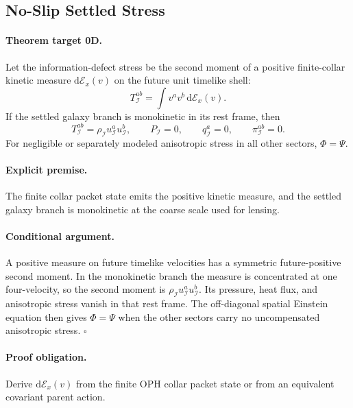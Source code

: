\documentclass[11pt]{article}
\newcommand{\dd}{\mathrm{d}}
\begin{document}
\subsection{No-Slip Settled Stress}

\paragraph{Theorem target 0D.}
Let the information-defect stress be the second moment of a positive
finite-collar kinetic measure \(\dd\mathcal E_x(v)\) on the future unit
timelike shell:
\begin{equation}
  T_{\mathcal I}^{ab}=\int v^a v^b\,\dd\mathcal E_x(v).
\end{equation}
If the settled galaxy branch is monokinetic in its rest frame, then
\begin{equation}
  T_{\mathcal I}^{ab}
  =
  \rho_{\mathcal I}u_{\mathcal I}^a u_{\mathcal I}^b,
  \qquad
  P_{\mathcal I}=0,
  \qquad
  q_{\mathcal I}^a=0,
  \qquad
  \pi_{\mathcal I}^{ab}=0.
\end{equation}
For negligible or separately modeled anisotropic stress in all other sectors,
\(\Phi=\Psi\).

\paragraph{Explicit premise.}
The finite collar packet state emits the positive kinetic measure, and the
settled galaxy branch is monokinetic at the coarse scale used for lensing.

\paragraph{Conditional argument.}
A positive measure on future timelike velocities has a symmetric
future-positive second moment.  In the monokinetic branch the measure is
concentrated at one four-velocity, so the second moment is
\(\rho_{\mathcal I}u_{\mathcal I}^a u_{\mathcal I}^b\).  Its pressure, heat
flux, and anisotropic stress vanish in that rest frame.  The off-diagonal
spatial Einstein equation then gives \(\Phi=\Psi\) when the other sectors
carry no uncompensated anisotropic stress. \(\square\)

\paragraph{Proof obligation.}
Derive \(\dd\mathcal E_x(v)\) from the finite OPH collar packet state or from
an equivalent covariant parent action.
\end{document}
